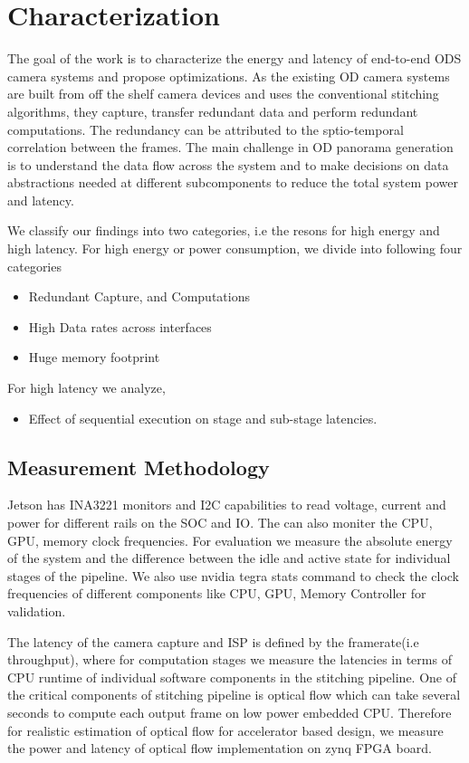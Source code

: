 \chapter{Characterization}
\label{chap:Char}
The goal of the work is to characterize the energy and latency of end-to-end ODS camera  systems and propose optimizations. As the existing OD camera systems are built from off the shelf camera devices and uses the conventional stitching algorithms, they capture, transfer redundant data and perform redundant computations. The redundancy can be attributed to the sptio-temporal correlation between the frames. The main challenge in OD panorama generation is to understand the data flow across the system and to make decisions on data abstractions needed at different subcomponents to reduce the total system power and latency.

We classify our findings into two categories, i.e the resons for high energy and high latency.
For high energy or power consumption, we divide into following four categories
\begin{itemize}
	\item Redundant Capture, and Computations
	\item High Data rates across interfaces
	\item Huge memory footprint
\end{itemize}
For high latency we analyze,
\begin{itemize}
	\item Effect of sequential execution on stage and sub-stage latencies.
\end{itemize}

\section{Measurement Methodology} %
Jetson has INA3221 monitors and I2C capabilities to read voltage, current and power for different rails on the SOC and IO. The can also moniter the CPU, GPU, memory clock frequencies. For evaluation we measure the absolute energy of the system and the difference between the idle and active state for individual stages of the pipeline. We also use nvidia tegra stats command to check the clock frequencies of different components like CPU, GPU, Memory Controller for validation. 

The latency of the camera capture and ISP is defined by the framerate(i.e throughput), where for computation stages we measure the latencies in terms of CPU runtime of individual software components in the stitching pipeline. One of the critical components of stitching pipeline is optical flow which can take several seconds to compute each output frame on low power embedded CPU. Therefore for realistic estimation of optical flow for accelerator based design, we measure the power and latency of optical flow implementation on zynq FPGA board. 

